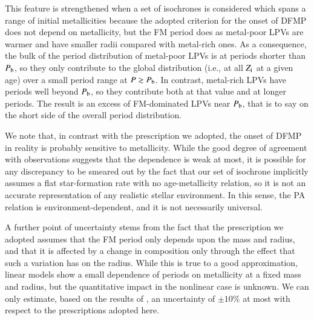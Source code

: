 \documentclass[letter]{aa}
\newcommand{\Zi}{Z_{\rm i}}
\newcommand{\Pb}{P_{\rm b}}
\begin{document}
This feature is strengthened when a set of isochrones is considered which spans a range of initial metallicities because the adopted criterion for the onset of DFMP does not depend on metallicity, but the FM period does as metal-poor LPVs are warmer and have smaller radii compared with metal-rich ones. As a consequence, the bulk of the period distribution of metal-poor LPVs is at periods shorter than $\Pb$, so they only contribute to the global distribution (i.e., at all $\Zi$ at a given age) over a small period range at $P\gtrsim\Pb$. In contrast, metal-rich LPVs have periods well beyond $\Pb$, so they contribute both at that value and at longer periods. The result is an excess of FM-dominated LPVs near $\Pb$, that is to say on the short side of the overall period distribution.

We note that, in contrast with the prescription we adopted, the onset of DFMP in reality is probably sensitive to metallicity. While the good degree of agreement with observations suggests that the dependence is weak at most, it is possible for any discrepancy to be smeared out by the fact that our set of isochrone implicitly assumes a flat star-formation rate with no age-metallicity relation, so it is not an accurate representation of any realistic stellar environment. In this sense, the PA relation is environment-dependent, and it is not necessarily universal.

A further point of uncertainty stems from the fact that the prescription we adopted assumes that the FM period only depends upon the mass and radius, and that it is affected by a change in composition only through the effect that such a variation has on the radius. While this is true to a good approximation, linear models show a small dependence of periods on metallicity at a fixed mass and radius, but the quantitative impact in the nonlinear case is unknown. We can only estimate, based on the results of \citet{Trabucchi_etal_2019}, an uncertainty of $\pm10\%$ at most with respect to the prescriptions adopted here.
\end{document}
